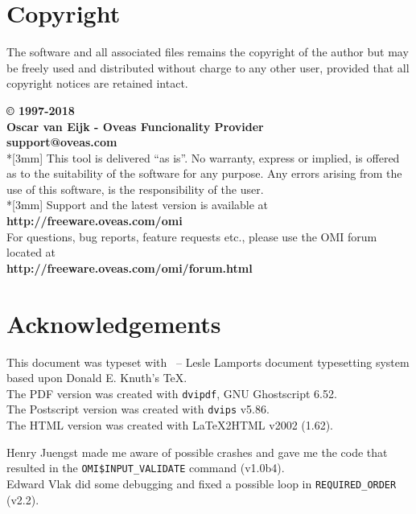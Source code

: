 \documentclass[a4paper]{book}
\newcommand{\vs}{\vspace{3mm}}
\renewcommand{\indent}{\hspace*{5mm}}
\begin{document}
\section*{Copyright}
\label{subsec:copyrightbrary}

The software and all associated files remains the copyright of the author 
but may be freely used and distributed without charge to any other user, 
provided that all copyright notices are retained intact.

\noindent\textbf{{\copyright} 1997-2018\\
Oscar van Eijk - Oveas Funcionality Provider\\
support@oveas.com}\\*[3mm]
This tool is delivered ``as is''. No warranty, express or implied, is 
offered as to the suitability of the software for any purpose. Any errors 
arising from the use of this software, is the responsibility of the user.\\*[3mm]
Support and the latest version is available at \\
\indent\textbf{http://freeware.oveas.com/omi} \\
For questions, bug reports, feature requests etc., please use the OMI forum located at \\
\indent\textbf{http://freeware.oveas.com/omi/forum.html}

\section*{Acknowledgements}

This document was typeset with \LaTeXe\ -- Lesle Lamports document typesetting system
based upon Donald E. Knuth's \TeX.\\
The PDF version was created with \texttt{dvipdf}, GNU Ghostscript 6.52.\\
The Postscript version was created with \texttt{dvips} v5.86. \\
The HTML version was created with LaTeX2HTML v2002 (1.62).

\vs

Henry Juengst made me aware of possible crashes and gave me the code that
resulted in the \texttt{OMI\$INPUT\_VALIDATE} command (v1.0b4). \\
Edward Vlak did some debugging and fixed a possible loop in \texttt{REQUIRED\_ORDER} (v2.2).
\end{document}
